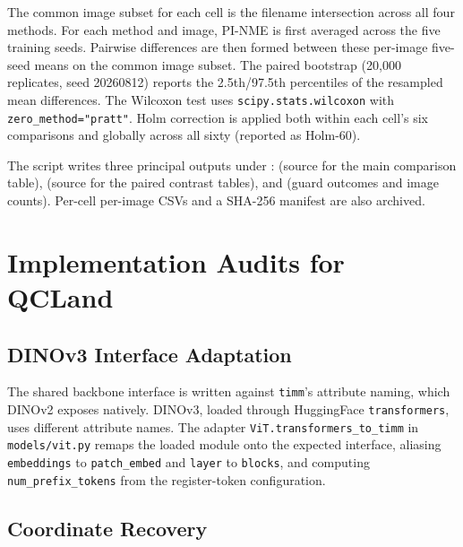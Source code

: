The common image subset for each cell is the filename intersection
across all four methods. For each method and image, PI-NME is first
averaged across the five training seeds. Pairwise differences are
then formed between these per-image five-seed means on the common
image subset. The paired bootstrap (20{,}000 replicates, seed
20260812) reports the 2.5th/97.5th percentiles of the resampled mean
differences. The Wilcoxon test uses
\texttt{scipy.stats.wilcoxon} with \texttt{zero\_method="pratt"}.
Holm correction is applied both within each cell's six comparisons
and globally across all sixty (reported as Holm-60).

The script writes three principal outputs under
:
 (source for the main
comparison table), 
(source for the paired contrast tables), and
 (guard outcomes and image
counts). Per-cell per-image CSVs and a SHA-256 manifest are also
archived.



\section{Implementation Audits for QCLand}
\label{app:method-implementation-detail}


\subsection{DINOv3 Interface Adaptation}
\label{app:dinov3-adapter}

The shared backbone interface is written against \texttt{timm}'s
attribute naming, which DINOv2 exposes natively. DINOv3, loaded
through HuggingFace \texttt{transformers}, uses different attribute
names. The adapter \texttt{ViT.transformers\_to\_timm} in
\texttt{models/vit.py} remaps the loaded module onto the expected
interface, aliasing \texttt{embeddings} to \texttt{patch\_embed}
and \texttt{layer} to \texttt{blocks}, and computing
\texttt{num\_prefix\_tokens} from the register-token configuration.


\subsection{Coordinate Recovery}
\label{app:coordinate-space-fix}

